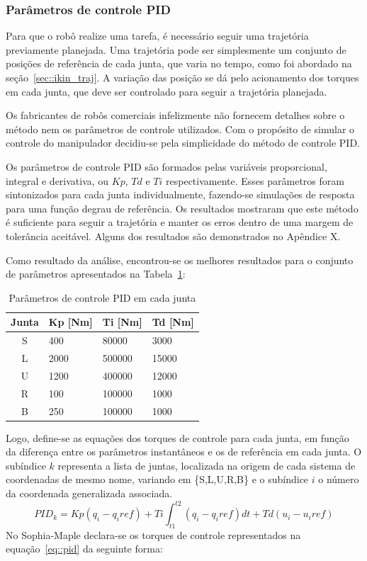 \subsubsection{Parâmetros de controle PID}

Para que o robô realize uma tarefa, é necessário seguir uma trajetória
previamente planejada. Uma trajetória pode ser simplesmente um conjunto de
posições de referência de cada junta, que varia no tempo, como foi abordado na
seção~\ref{sec::ikin_traj}. A variação das posição se dá pelo acionamento dos
torques em cada junta, que deve ser controlado para seguir a trajetória
planejada. 

Os fabricantes de robôs comerciais infelizmente não fornecem detalhes sobre o
método nem os parâmetros de controle utilizados.
Com o propósito de simular o controle do manipulador decidiu-se pela
simplicidade do método de controle PID.

Os parâmetros de controle PID são formados pelas variáveis proporcional,
integral e derivativa, ou $Kp$, $Td$ e $Ti$ respectivamente. Esses parâmetros
foram sintonizados para cada junta individualmente, fazendo-se simulações de
resposta para uma função degrau de referência. Os resultados mostraram que este
método é suficiente para seguir a trajetória e manter os erros dentro de uma
margem de tolerância aceitável. Alguns dos resultados são demonstrados no
Apêndice X.

Como resultado da análise, encontrou-se os melhores resultados
para o conjunto de parâmetros apresentados na Tabela~\ref{tab::pid}:
%
\begin{table}[h]
\centering
\caption{Parâmetros de controle PID em cada junta}
\label{tab::pid}
\begin{tabular}{@{}clll@{}}
\toprule
\textbf{Junta} & \textbf{Kp [Nm]} & \textbf{Ti [Nm]} & \textbf{Td [Nm]} \\ \midrule 
S              & 400         & 80000       & 3000        \\
L              & 2000        & 500000      & 15000       \\
U              & 1200        & 400000      & 12000       \\
R              & 100         & 100000      & 1000        \\
B              & 250         & 100000      & 1000        \\ \bottomrule
\end{tabular}
\end{table}
%
Logo, define-se as equações dos torques de controle para cada junta, em função
da diferença entre os parâmetros instantâneos e os de referência em cada junta.
O subíndice $k$ representa a lista de juntas, localizada na origem de cada
sistema de coordenadas de mesmo nome, variando em \{S,L,U,R,B\} e o
subíndice $i$ o número da coordenada generalizada associada.
%
\begin{equation}
	PID_{k} = Kp(q_i-q_i{ref}) + Ti\int_{t1}^{t2} (q_i-q_i{ref})dt +
	Td(u_i-u_i{ref}) \label{eq::pid}
\end{equation}
%
No Sophia-Maple declara-se os torques de controle representados na
equação~\ref{eq::pid} da seguinte forma:

